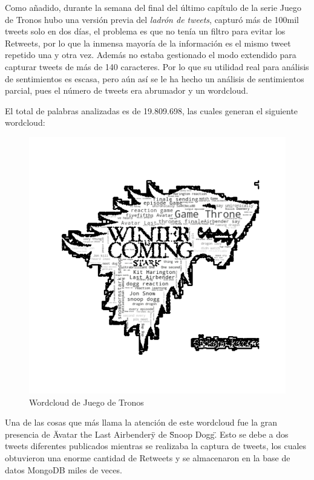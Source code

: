 Como añadido, durante la semana del final del último capítulo de la serie Juego de Tronos hubo una versión previa del \textit{ladrón de tweets}, capturó más de 100mil tweets solo en dos días, el problema es que no tenía un filtro para evitar los Retweets, por lo que la inmensa mayoría de la información es el mismo tweet repetido una y otra vez. Además no estaba gestionado el modo extendido para capturar tweets de más de 140 caracteres. Por lo que su utilidad real para análisis de sentimientos es escasa, pero aún así se le ha hecho un análisis de sentimientos parcial, pues el número de tweets era abrumador y un wordcloud. 



El total de palabras analizadas es de 19.809.698, las cuales generan el siguiente wordcloud:

\begin{figure}[H]
	\centering
	\includegraphics[scale=1]{imagenes/JdTLogo.png}
	\caption{Wordcloud de Juego de Tronos}
	\label{fig:wordcloudJdT}
\end{figure} 

Una de las cosas que más llama la atención de este wordcloud fue la gran presencia de \"Avatar the Last Airbender\" y de \"Snoop Dogg\". Esto se debe a dos tweets diferentes publicados mientras se realizaba la captura de tweets, los cuales obtuvieron una enorme cantidad de Retweets y se almacenaron en la base de datos MongoDB miles de veces. 


